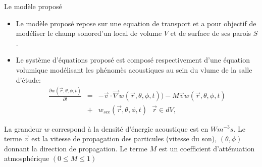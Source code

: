 \begin{frame}{Le modèle proposé}
\begin{itemize}
\item Le modèle proposé repose sur une equation de transport et a pour objectif de modéliser le champ sonored'un local de volume $V$ et  de surface de ses parois $S$. 
\item
 Le système d'équations proposé est composé respectivement d'une équation volumique modélisant   les phénomès acoustiques au sein du vlume  de la salle d'étude:
\begin{eqnarray*}
\frac{\partial w(\vec{r},\theta,\phi,t)}{\partial t}&=& -	\vec{v} \cdot\vec{\nabla}w(\vec{r},\theta,\phi,t))-M\vec{v} w(\vec{r},\theta,\phi,t) \\
&+&  w_{sce} (\vec{r},\theta,\phi,t) \ \ \  \vec{r}\in dV,
\label{CHeq}
\end{eqnarray*}
\end{itemize}
La grandeur $w$ correspond à la densité d'énergie acoustique est en $W m^{-3}s$. Le terme $\vec{v}$ est la vitesse de propagation des particules (vitesse du son), $(\theta,\phi)$  donnant la direction de propagation. Le terme $M$ est un coefficient d'atténuation atmosphérique $(0\leq M \leq 1)$
\end{frame}
